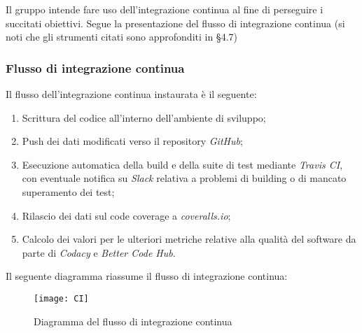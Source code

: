 \documentclass[../NormediProgetto.tex]{subfiles}
\begin{document}
Il gruppo intende fare uso dell'integrazione continua al fine di perseguire i succitati obiettivi. Segue la presentazione del flusso di integrazione continua (si noti che gli strumenti citati sono approfonditi in §4.7)

\subsubsection{Flusso di integrazione continua}

Il flusso dell'integrazione continua instaurata è il seguente:
\begin{enumerate}
	\item Scrittura del codice all'interno dell'ambiente di sviluppo;
	\item Push dei dati modificati verso il repository \textit{GitHub};
	\item Esecuzione automatica della build e della suite di test mediante \textit{Travis CI}, con eventuale notifica su \textit{Slack} relativa a problemi di building o di mancato superamento dei test;
	\item Rilascio dei dati sul code coverage a \textit{coveralls.io};
	\item Calcolo dei valori per le ulteriori metriche relative alla qualità del software da parte di \textit{Codacy} e \textit{Better Code Hub}.
\end{enumerate}

Il seguente diagramma riassume il flusso di integrazione continua:


\begin{figure}[H]
	\texttt{[image: CI]}
	\centering
	\caption{Diagramma del flusso di integrazione continua}
\end{figure}
\end{document}
